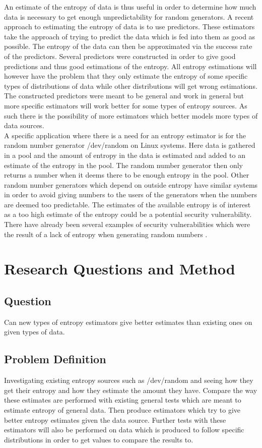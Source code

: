 \documentclass[a4paper,11pt]{report}
\begin{document}
\noindent
An estimate of the entropy of data is thus useful in order to determine
how much data is necessary to get enough unpredictability for random
generators. A recent approach to estimating the entropy of data is to use 
predictors\cite{eprint-2015-26658}.
These estimators take the approach of trying to predict the data
which is fed into them as good as possible. The entropy of the data can then
be approximated via the success rate of the predictors. Several predictors were
constructed in order to give good predictions and thus good estimations of the 
entropy. All entropy estimations will however have the problem that they only
estimate the entropy of some specific types of distributions of data while 
other distributions will get wrong estimations. The constructed predictors were 
meant to be general and work in general but more specific estimators will work
better for some types of entropy sources. As such there is the possibility of
more estimators which better models more types of data sources. \\

\noindent
A specific application where there is a need for an entropy estimator is for
the random number generator /dev/random on Linux systems. Here data is 
gathered in a pool and the amount of entropy in the data is estimated 
and added to an estimate of the entropy in the pool\cite{/dev/random}.
The random number generator then only returns a number when it deems there 
to be enough entropy in the pool.
Other random number generators which depend on outside entropy 
have similar systems in order to avoid giving numbers to 
the users of the generators when the numbers are deemed too predictable.
The estimates of the available entropy is of interest as a too high estimate of
the entropy could be a potential security vulnerability. There have already been 
several examples of security vulnerabilities which were the result of a lack
of entropy when generating random numbers\cite{goldberg1996randomness}
\cite{yilek2009private}.
\section*{Research Questions and Method}
\subsection*{Question}
Can new types of entropy estimators give better estimates than existing
ones on given types of data.
\subsection*{Problem Definition}
Investigating existing entropy sources such as /dev/random and seeing how
they get their entropy and how they estimate the amount they have. Compare the
way these estimates are performed with existing general tests which are meant 
to estimate entropy of general data. Then produce estimators which try to give
better entropy estimates given the data source.
Further tests with these estimators will also be performed on data which 
is produced to follow specific distributions in order to get 
values to compare the results to.
\end{document}
